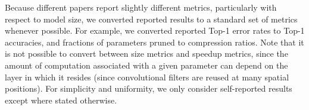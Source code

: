 





Because different papers report slightly different metrics, particularly with respect to model size, we converted reported results to a standard set of metrics whenever possible. For example, we converted reported Top-1 error rates to Top-1 accuracies, and fractions of parameters pruned to compression ratios. Note that it is not possible to convert between size metrics and speedup metrics, since the amount of computation associated with a given parameter can depend on the layer in which it resides (since convolutional filters are reused at many spatial positions). For simplicity and uniformity, we only consider self-reported results except where stated otherwise.

